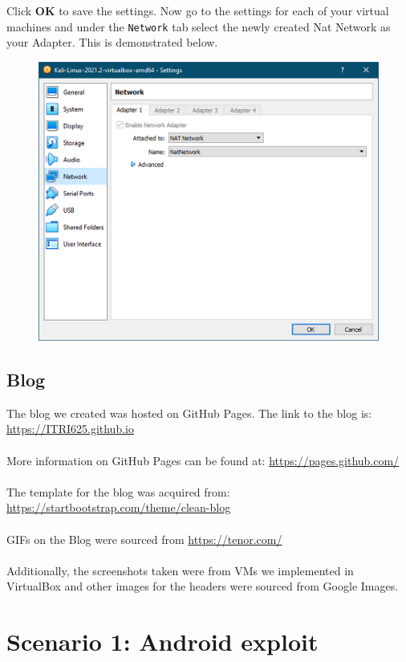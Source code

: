 \documentclass[a4paper, 12pt, titlepage]{report}
\begin{document}
Click \textbf{OK} to save the settings. Now go to the settings for each of your virtual machines and under the \texttt{Network} tab select the newly created Nat Network as your Adapter. This is demonstrated below.
\begin{figure}[H]
    \centering
    \includegraphics[scale=1]{pics/net3.png}
\end{figure}
\section{Blog}
The blog we created was hosted on GitHub Pages. The link to the blog is:\\
\url{https://ITRI625.github.io}\\\\
More information on GitHub Pages can be found at: \url{https://pages.github.com/}\\\\
The template for the blog was acquired from:\\
\url{https://startbootstrap.com/theme/clean-blog}\\\\
GIFs on the Blog were sourced from \url{https://tenor.com/}\\\\
Additionally, the screenshots taken were from VMs we implemented in VirtualBox and other images for the headers were sourced from Google Images.
\chapter{Scenario 1: Android exploit}
\label{sec:sec1}
\end{document}
